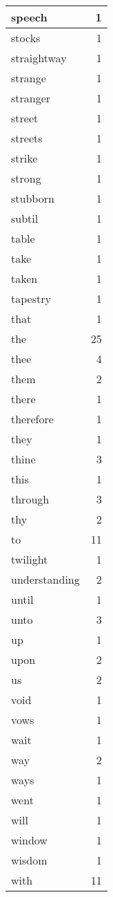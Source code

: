 \begin{center}
\begin{longtable}{l|r}
speech & 1\\ \hline 
stocks & 1\\ \hline 
straightway & 1\\ \hline 
strange & 1\\ \hline 
stranger & 1\\ \hline 
street & 1\\ \hline 
streets & 1\\ \hline 
strike & 1\\ \hline 
strong & 1\\ \hline 
stubborn & 1\\ \hline 
subtil & 1\\ \hline 
table & 1\\ \hline 
take & 1\\ \hline 
taken & 1\\ \hline 
tapestry & 1\\ \hline 
that & 1\\ \hline 
the & 25\\ \hline 
thee & 4\\ \hline 
them & 2\\ \hline 
there & 1\\ \hline 
therefore & 1\\ \hline 
they & 1\\ \hline 
thine & 3\\ \hline 
this & 1\\ \hline 
through & 3\\ \hline 
thy & 2\\ \hline 
to & 11\\ \hline 
twilight & 1\\ \hline 
understanding & 2\\ \hline 
until & 1\\ \hline 
unto & 3\\ \hline 
up & 1\\ \hline 
upon & 2\\ \hline 
us & 2\\ \hline 
void & 1\\ \hline 
vows & 1\\ \hline 
wait & 1\\ \hline 
way & 2\\ \hline 
ways & 1\\ \hline 
went & 1\\ \hline 
will & 1\\ \hline 
window & 1\\ \hline 
wisdom & 1\\ \hline 
with & 11\\ \hline 

\end{longtable}
\end{center}
